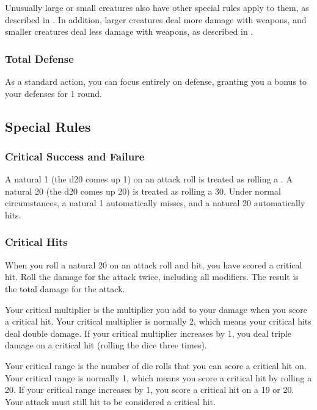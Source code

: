             Unusually large or small creatures also have other special rules apply to them, as described in .
            In addition, larger creatures deal more damage with weapons, and smaller creatures deal less damage with weapons, as described in .

        \subsubsection{Total Defense}\label{Total Defense}
            As a standard action, you can focus entirely on defense, granting you a  bonus to your defenses for 1 round.

    \subsection{Special Rules}\label{Special Rules}

        \subsubsection{Critical Success and Failure}\label{Critical Success and Failure}
            A natural 1 (the d20 comes up 1) on an attack roll is treated as rolling a .
            A natural 20 (the d20 comes up 20) is treated as rolling a 30.
            Under normal circumstances, a natural 1 automatically misses, and a natural 20 automatically hits.

        \subsubsection{Critical Hits}\label{Critical Hits}
            When you roll a natural 20 on an attack roll and hit, you have scored a critical hit.
            Roll the damage for the attack twice, including all modifiers.
            The result is the total damage for the attack.

             Your critical multiplier is the multiplier you add to your damage when you score a critical hit.
            Your critical multiplier is normally 2, which means your critical hits deal double damage.
            If your critical multiplier increases by 1, you deal triple damage on a critical hit (rolling the dice three times).

             Your critical range is the number of die rolls that you can score a critical hit on.
            Your critical range is normally 1, which means you score a critical hit by rolling a 20.
            If your critical range increases by 1, you score a critical hit on a 19 or 20.
            Your attack must still hit to be considered a critical hit.

